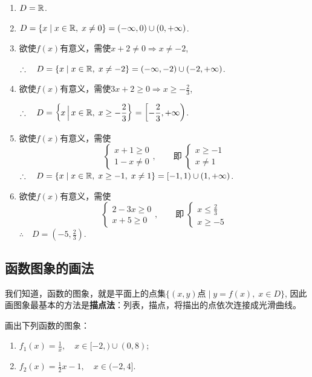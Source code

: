 \begin{solution}    
\begin{enumerate}[(1)]
    \item $D=\mathbb{R}$.
    \item $D=\{x\mid x\in\mathbb{R},\; x\ne 0\}=(-\infty,0)\cup(0,+\infty)$.
    \item 欲使$f(x)$有意义，需使$x+2\ne 0\Longrightarrow x\ne -2$,
    
$\therefore\quad D=\{x\mid x\in\mathbb{R},\; x\ne -2\}=(-\infty,-2)\cup(-2,+\infty)$.

\item 欲使$f(x)$有意义，需使$3x+2\ge 0\Longrightarrow x\ge -\frac{2}{3}$,
    
$\therefore\quad D=\left\{x\, \Big|\, x\in\mathbb{R},\; x\ge -\dfrac{2}{3}\right\}=\left[-\dfrac{2}{3},+\infty\right)$.

\item 欲使$f(x)$有意义，需使
\[\begin{cases}
    x+1\ge 0\\
    1-x\ne 0
\end{cases},\qquad \text{即}\; \begin{cases}
    x\ge -1\\x\ne 1
\end{cases}\]
$\therefore\quad D=\{x\mid x\in\mathbb{R},\; x\ge -1,\; x\ne 1\}=[-1,1)\cup(1,+\infty)$.
\item 欲使$f(x)$有意义，需使
\[\begin{cases}
    2-3x\ge 0\\
    x+5\ge 0
\end{cases},\qquad \text{即}\; \begin{cases}
    x\le \frac{2}{3}\\x\ge -5
\end{cases}\]
$\therefore\quad D=\left(-5,\frac{2}{3}\right)$.
\end{enumerate}
\end{solution}    

\subsection{函数图象的画法}
我们知道，函数的图象，就是平面上的点集$\{(x,y) \text{点}\mid y=f(x),\; x\in D\}$, 因此画图象最基本的方法是\textbf{描点法}：列表，描点，将描出的点依次连接成光滑曲线。

\begin{example}
    画出下列函数的图象：
\begin{multicols}{2}
    \begin{enumerate}[(1)]
    \item $f_1(x)=\frac{1}{x},\quad x\in[-2,)\cup (0,8)$;
    \item $f_2(x)=\frac{1}{2}x-1,\quad x\in (-2,4]$.
\end{enumerate}
\end{multicols}
\end{example}


